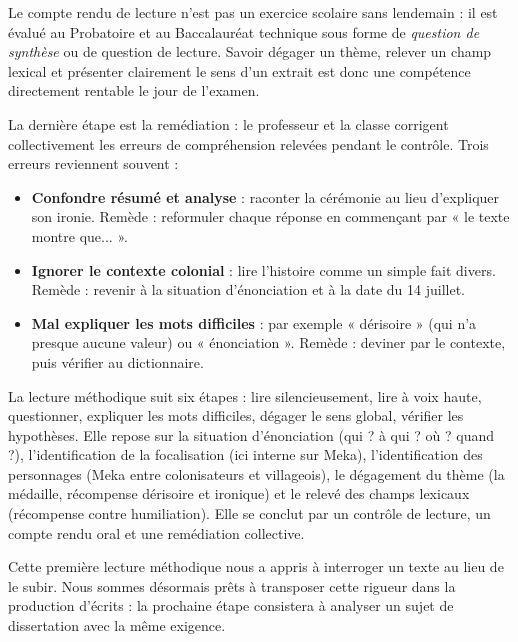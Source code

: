 \documentclass[11pt]{article}
\newcommand{\cle}[1]{{\popxbold\color{popdark}#1}}
\newcounter{popsec}
\newcounter{popsub}
\newcommand{\courssub}[1]{%
  \stepcounter{popsub}%
  \par\vspace{9pt}\noindent{\popxbold\fontsize{11.5}{13}\selectfont\color{popink}{\color{poporange}\thepopsec.\thepopsub}\hspace{6pt}#1}\par\nopagebreak\vspace{4pt}
}
\begin{document}
\begin{savaistu}
Le compte rendu de lecture n'est pas un exercice scolaire sans lendemain : il est évalué au Probatoire et au Baccalauréat technique sous forme de \emph{question de synthèse} ou de question de lecture. Savoir dégager un thème, relever un champ lexical et présenter clairement le sens d'un extrait est donc une compétence directement rentable le jour de l'examen.
\end{savaistu}

\courssub{Compte rendu et remédiation}

La dernière étape est la \cle{remédiation} : le professeur et la classe corrigent collectivement les erreurs de compréhension relevées pendant le contrôle. Trois erreurs reviennent souvent :

\begin{itemize}
\item \textbf{Confondre résumé et analyse} : raconter la cérémonie au lieu d'expliquer son ironie. Remède : reformuler chaque réponse en commençant par « le texte montre que... ».
\item \textbf{Ignorer le contexte colonial} : lire l'histoire comme un simple fait divers. Remède : revenir à la situation d'énonciation et à la date du 14 juillet.
\item \textbf{Mal expliquer les mots difficiles} : par exemple « dérisoire » (qui n'a presque aucune valeur) ou « énonciation ». Remède : deviner par le contexte, puis vérifier au dictionnaire.
\end{itemize}

\begin{aretenir}
La lecture méthodique suit six étapes : lire silencieusement, lire à voix haute, questionner, expliquer les mots difficiles, dégager le sens global, vérifier les hypothèses. Elle repose sur la situation d'énonciation (qui ? à qui ? où ? quand ?), l'identification de la focalisation (ici interne sur Meka), l'identification des personnages (Meka entre colonisateurs et villageois), le dégagement du thème (la médaille, récompense dérisoire et ironique) et le relevé des champs lexicaux (récompense contre humiliation). Elle se conclut par un contrôle de lecture, un compte rendu oral et une remédiation collective.
\end{aretenir}

Cette première lecture méthodique nous a appris à interroger un texte au lieu de le subir. Nous sommes désormais prêts à transposer cette rigueur dans la production d'écrits : la prochaine étape consistera à analyser un sujet de dissertation avec la même exigence.
\end{document}
